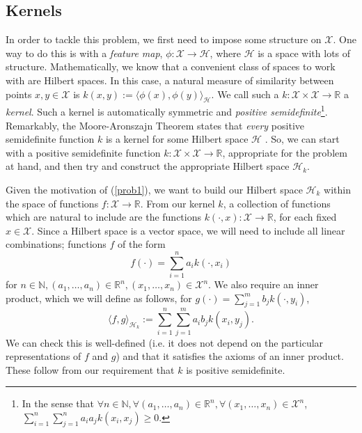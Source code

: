 \documentclass{article} %
\begin{document}
\subsection{Kernels}
In order to tackle this problem, we first need to impose some structure on $\mathcal{X}$. One way to do this is with a \textit{feature map}, $\phi:\mathcal{X}\rightarrow\mathcal{H}$, where $\mathcal{H}$ is a space with lots of structure. Mathematically, we know that a convenient class of spaces to work with are Hilbert spaces. In this case, a natural measure of similarity between points $x,y\in\mathcal{X}$ is $k(x,y):=\langle\phi(x),\phi(y)\rangle_\mathcal{H}$. We call such a $k:\mathcal{X}\times\mathcal{X}\rightarrow\mathbb{R}$ a \textit{kernel}. Such a kernel is automatically symmetric and \textit{positive semidefinite}\footnote{In the sense that $\forall n\in\mathbb{N}, \forall(a_1,\dots,a_n)\in\mathbb{R}^n,\forall(x_1,\dots,x_n)\in\mathcal{X}^n$, $\sum_{i=1}^n \sum_{j=1}^n a_i a_j k(x_i,x_j)\geq 0$.}. Remarkably, the Moore-Aronszajn Theorem states that \textit{every} positive semidefinite function $k$ is a kernel for some Hilbert space $\mathcal{H}$ \cite{Hofmann}. So, we can start with a positive semidefinite function $k:\mathcal{X}\times\mathcal{X}\rightarrow\mathbb{R}$, appropriate for the problem at hand, and then try and construct the appropriate Hilbert space $\mathcal{H}_k$.

Given the motivation of (\ref{prob1}), we want to build our Hilbert space $\mathcal{H}_k$ within the space of functions $f:\mathcal{X}\rightarrow\mathbb{R}$. From our kernel $k$, a collection of functions which are natural to include are the functions $k(\cdot,x):\mathcal{X}\rightarrow\mathbb{R}$, for each fixed $x \in \mathcal{X}$. Since a Hilbert space is a vector space, we will need to include all linear combinations; functions $f$ of the form $$f(\cdot)=\sum_{i=1}^n a_i k(\cdot,x_i)$$ for $n\in\mathbb{N}, (a_1,\dots,a_n)\in\mathbb{R}^n,(x_1,\dots,x_n)\in\mathcal{X}^n$. We also require an inner product, which we will define as follows, for $g(\cdot)=\sum_{j=1}^m b_j k(\cdot,y_i)$, $$\langle f,g\rangle_{\mathcal{H}_k}:=\sum_{i=1}^n \sum_{j=1}^m a_i b_j k(x_i,y_j).$$ We can check this is well-defined (i.e. it does not depend on the particular representations of $f$ and $g$) and that it satisfies the axioms of an inner product. These follow from our requirement that $k$ is positive semidefinite.
\end{document}

